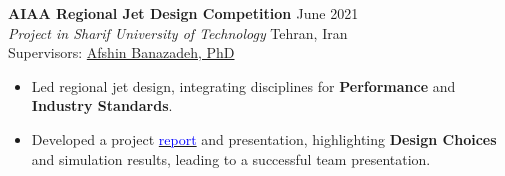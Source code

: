 \documentclass[12pt]{article}
\begin{document}
\vspace{-4pt}
\noindent
{\bfseries AIAA Regional Jet Design Competition
\href{https://github.com/alibaniasad1999/Airplane-Design-II}{\faGithub}
}
\hfill June 2021 \\
\noindent \textit{Project in Sharif University of Technology
} \hfill Tehran, Iran \\
\noindent Supervisors:
\href{http://ae.sharif.edu/~portal/faculty/1014037799}{Afshin Banazadeh, PhD}
\vspace{-8pt}
\begin{itemize} \itemsep -4pt %
    \item Led regional jet design, integrating  disciplines for \textbf{Performance} and \textbf{Industry Standards}.
	\item Developed a project \href{https://drive.google.com/drive/folders/1nyzjUDzIgUuoJlB1KRaJeTH69p20cMUK?usp=sharing}{\textcolor{blue}{report}} and presentation, highlighting \textbf{Design Choices} and simulation results, leading to a successful team presentation.
\end{itemize}








\vspace{0.2in} %


\end{document}
